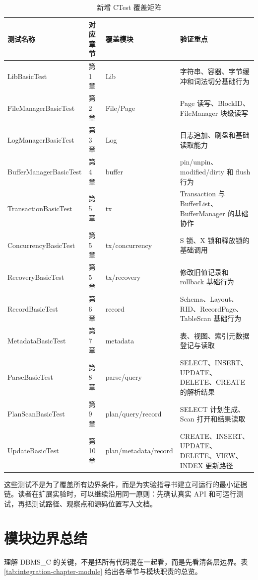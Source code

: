 \begin{table}[htbp]
  \centering
  \scriptsize
  \setlength{\tabcolsep}{2.5pt}
  \caption{新增 CTest 覆盖矩阵}
  \label{tab:integration-ctest-matrix}
  \begin{tabularx}{\textwidth}{>{\raggedright\arraybackslash}p{38mm}p{15mm}p{31mm}Y}
    \toprule
    测试名称 & 对应章节 & 覆盖模块 & 验证重点 \\
    \midrule
    LibBasicTest & 第1章 & Lib & 字符串、容器、字节缓冲和词法切分基础行为 \\
    FileManagerBasicTest & 第2章 & File/Page & Page 读写、BlockID、FileManager 块级读写 \\
    LogManagerBasicTest & 第3章 & Log & 日志追加、刷盘和基础读取能力 \\
    BufferManagerBasicTest & 第4章 & buffer & pin/unpin、modified/dirty 和 flush 行为 \\
    TransactionBasicTest & 第5章 & tx & Transaction 与 BufferList、BufferManager 的基础协作 \\
    ConcurrencyBasicTest & 第5章 & tx/concurrency & S 锁、X 锁和释放锁的基础调用 \\
    RecoveryBasicTest & 第5章 & tx/recovery & 修改旧值记录和 rollback 基础行为 \\
    RecordBasicTest & 第6章 & record & Schema、Layout、RID、RecordPage、TableScan 基础行为 \\
    MetadataBasicTest & 第7章 & metadata & 表、视图、索引元数据登记与读取 \\
    ParseBasicTest & 第8章 & parse/query & SELECT、INSERT、UPDATE、DELETE、CREATE 的解析结果 \\
    PlanScanBasicTest & 第9章 & plan/query/record & SELECT 计划生成、Scan 打开和结果读取 \\
    UpdateBasicTest & 第10章 & plan/metadata/record & CREATE、INSERT、UPDATE、DELETE、VIEW、INDEX 更新路径 \\
    \bottomrule
  \end{tabularx}
\end{table}

这些测试不是为了覆盖所有边界条件，而是为实验指导书建立可运行的最小证据链。读者在扩展实验时，可以继续沿用同一原则：先确认真实 API 和可运行测试，再把测试路径、观察点和源码位置写入文档。

\section{模块边界总结}

理解 DBMS\_C 的关键，不是把所有代码混在一起看，而是先看清各层边界。表 \ref{tab:integration-chapter-module} 给出各章节与模块职责的总览。

